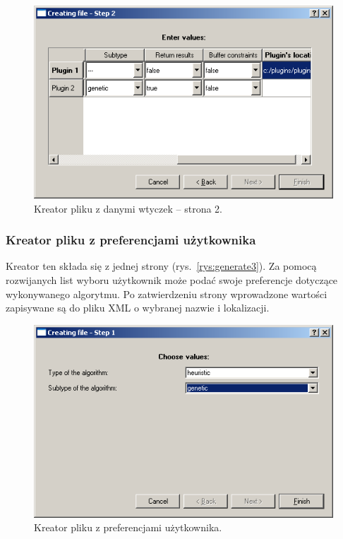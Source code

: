 \begin{figure}[htp]
\centering\includegraphics[scale=0.7]{figures/screens/generate2_2_2.png}
\caption{Kreator pliku z danymi wtyczek -- strona 2.}\label{rys:generate2_2_2}
\end{figure}

\subsubsection*{Kreator pliku z preferencjami użytkownika}

Kreator ten składa się z jednej strony (rys.~\vref{rys:generate3}). Za pomocą rozwijanych list wyboru użytkownik 
może podać swoje preferencje dotyczące wykonywanego algorytmu. Po zatwierdzeniu strony wprowadzone wartości zapisywane są do pliku XML o wybranej 
nazwie i lokalizacji.

\begin{figure}[htp]
\centering\includegraphics[scale=0.7]{figures/screens/generate3.png}
\caption{Kreator pliku z preferencjami użytkownika.}\label{rys:generate3}
\end{figure}

